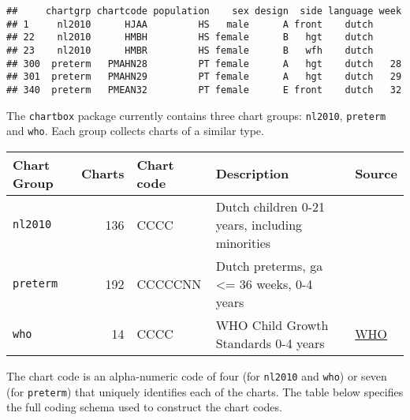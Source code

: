 \documentclass[
]{book}
\begin{document}
\begin{verbatim}
##     chartgrp chartcode population    sex design  side language week
## 1     nl2010      HJAA         HS   male      A front    dutch     
## 22    nl2010      HMBH         HS female      B   hgt    dutch     
## 23    nl2010      HMBR         HS female      B   wfh    dutch     
## 300  preterm   PMAHN28         PT female      A   hgt    dutch   28
## 301  preterm   PMAHN29         PT female      A   hgt    dutch   29
## 340  preterm   PMEAN32         PT female      E front    dutch   32
\end{verbatim}

The \texttt{chartbox} package currently contains three chart groups: \texttt{nl2010}, \texttt{preterm} and \texttt{who}. Each group collects charts of a similar type.

\begin{longtable}[]{@{}lrlll@{}}
\toprule
Chart Group & Charts & Chart code & Description & Source \\
\midrule
\endhead
\texttt{nl2010} & 136 & CCCC & Dutch children 0-21 years, including minorities & \citet{talma2010} \\
\texttt{preterm} & 192 & CCCCCNN & Dutch preterms, ga \textless= 36 weeks, 0-4 years & \citet{bocca2012} \\
\texttt{who} & 14 & CCCC & WHO Child Growth Standards 0-4 years & \href{https://www.who.int/childgrowth/en/}{WHO} \\
\bottomrule
\end{longtable}

The chart code is an alpha-numeric code of four (for \texttt{nl2010} and \texttt{who}) or seven (for \texttt{preterm}) that uniquely identifies each of the charts. The table below specifies the full coding schema used to construct the chart codes.
\end{document}
